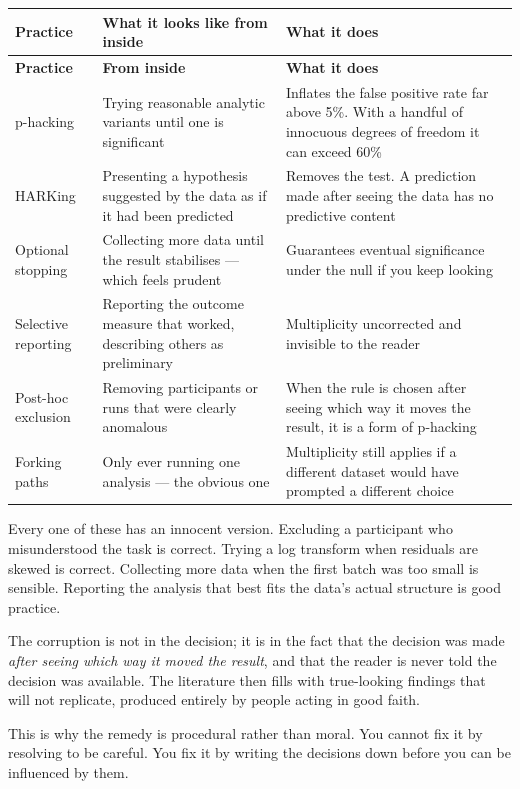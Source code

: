 \begin{center}
\small
\begin{longtable}{@{}L{3.0cm}L{4.8cm}L{6.4cm}@{}}
\toprule
\textbf{Practice} & \textbf{What it looks like from inside} & \textbf{What it does} \\
\midrule
\endfirsthead
\toprule
\textbf{Practice} & \textbf{From inside} & \textbf{What it does} \\
\midrule
\endhead
\bottomrule
\endfoot
p-hacking
  & Trying reasonable analytic variants until one is significant
  & Inflates the false positive rate far above 5\%. With a handful of
    innocuous degrees of freedom it can exceed 60\%~\cite{simmons2011false} \\
HARKing
  & Presenting a hypothesis suggested by the data as if it had been predicted
  & Removes the test. A prediction made after seeing the data has no
    predictive content~\cite{kerr1998harking} \\
Optional stopping
  & Collecting more data until the result stabilises --- which feels prudent
  & Guarantees eventual significance under the null if you keep looking \\
Selective reporting
  & Reporting the outcome measure that worked, describing others as
    preliminary
  & Multiplicity uncorrected and invisible to the reader \\
Post-hoc exclusion
  & Removing participants or runs that were clearly anomalous
  & When the rule is chosen after seeing which way it moves the result, it is
    a form of p-hacking \\
Forking paths
  & Only ever running one analysis --- the obvious one
  & Multiplicity still applies if a different dataset would have prompted a
    different choice~\cite{gelman2013garden} \\
\end{longtable}
\end{center}

\begin{alertbox}
Every one of these has an innocent version. Excluding a participant who
misunderstood the task is correct. Trying a log transform when residuals are
skewed is correct. Collecting more data when the first batch was too small is
sensible. Reporting the analysis that best fits the data's actual structure is
good practice.

\medskip
The corruption is not in the decision; it is in the fact that the decision was
made \emph{after seeing which way it moved the result}, and that the reader is
never told the decision was available. The literature then fills with true-looking
findings that will not replicate, produced entirely by people acting in good
faith.

\medskip
This is why the remedy is procedural rather than moral. You cannot fix it by
resolving to be careful. You fix it by writing the decisions down before you
can be influenced by them.
\end{alertbox}

